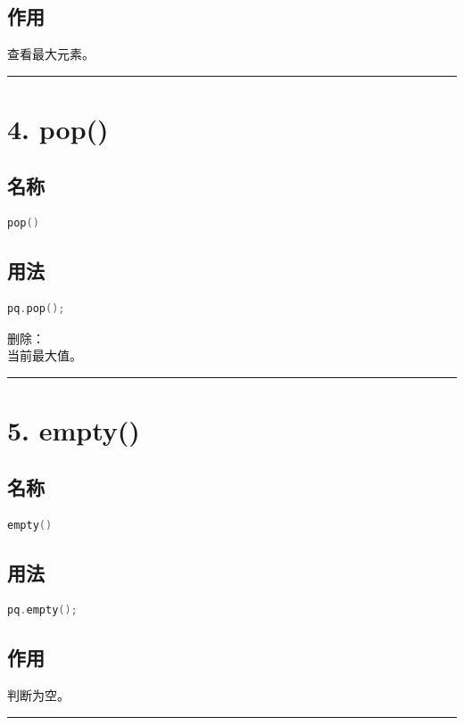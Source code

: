 \documentclass[10pt,twocolumn]{extarticle}
\begin{document}
\subsection{作用}
查看最大元素。

\noindent\rule{\linewidth}{0.4pt}

\section{4. pop()}

\subsection{名称}
\begin{lstlisting}[language=C++]
pop()
\end{lstlisting}

\subsection{用法}
\begin{lstlisting}[language=C++]
pq.pop();
\end{lstlisting}
删除：\\
当前最大值。

\noindent\rule{\linewidth}{0.4pt}

\section{5. empty()}

\subsection{名称}
\begin{lstlisting}[language=C++]
empty()
\end{lstlisting}

\subsection{用法}
\begin{lstlisting}[language=C++]
pq.empty();
\end{lstlisting}

\subsection{作用}
判断为空。

\noindent\rule{\linewidth}{0.4pt}
\end{document}
